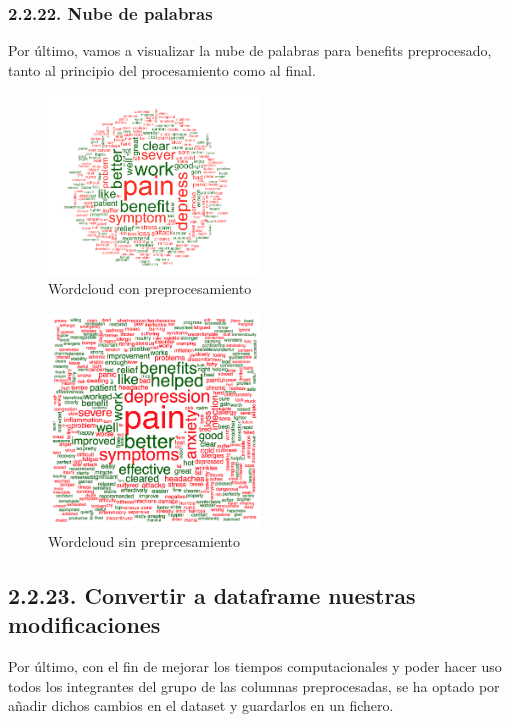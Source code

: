 \documentclass[spanish,]{article}
\begin{document}
\subsubsection{2.2.22. Nube de palabras}\label{nube-de-palabras}

Por último, vamos a visualizar la nube de palabras para benefits
preprocesado, tanto al principio del procesamiento como al final.

\begin{figure}[h]
    \centering
    \includegraphics[width=0.5\textwidth]{imagenes/wordcloud1.png}
    \caption{Wordcloud con preprocesamiento}
    \label{benefits2}
\end{figure}

\begin{figure}[h]
    \centering
    \includegraphics[width=0.5\textwidth]{imagenes/wordcloud2.png}
    \caption{Wordcloud sin preprcesamiento}
    \label{benefits2}
\end{figure}

\subsection{2.2.23. Convertir a dataframe nuestras
modificaciones}\label{convertir-a-dataframe-nuestras-modificaciones}

Por último, con el fin de mejorar los tiempos computacionales y poder
hacer uso todos los integrantes del grupo de las columnas preprocesadas,
se ha optado por añadir dichos cambios en el dataset y guardarlos en un
fichero.
\end{document}
